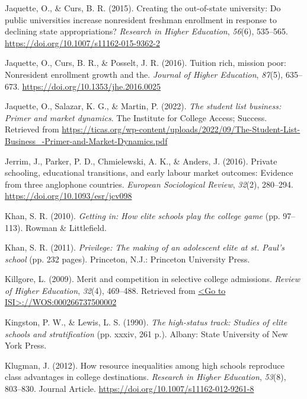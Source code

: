 \documentclass[
  12pt,
]{article}
\newlength{\cslhangindent}
\newlength{\cslentryspacingunit} %
\newenvironment{CSLReferences}[2] %
 {%
  \setlength{\parindent}{0pt}
  \ifodd #1
  \let\oldpar\par
  \def\par{\hangindent=\cslhangindent\oldpar}
  \fi
  \setlength{\parskip}{#2\cslentryspacingunit}
 }%
 {}
\begin{document}
\begin{CSLReferences}{1}{0}
\leavevmode{}%
Jaquette, O., \& Curs, B. R. (2015). Creating the out-of-state university: Do public universities increase nonresident freshman enrollment in response to declining state appropriations? \emph{Research in Higher Education}, \emph{56}(6), 535--565. \url{https://doi.org/10.1007/s11162-015-9362-2}

\leavevmode{}%
Jaquette, O., Curs, B. R., \& Posselt, J. R. (2016). Tuition rich, mission poor: Nonresident enrollment growth and the. \emph{Journal of Higher Education}, \emph{87}(5), 635--673. \url{https://doi.org/10.1353/jhe.2016.0025}

\leavevmode{}%
Jaquette, O., Salazar, K. G., \& Martin, P. (2022). \emph{The student list business: Primer and market dynamics}. The Institute for College Access; Success. Retrieved from \url{https://ticas.org/wp-content/uploads/2022/09/The-Student-List-Business_-Primer-and-Market-Dynamics.pdf}

\leavevmode{}%
Jerrim, J., Parker, P. D., Chmielewski, A. K., \& Anders, J. (2016). Private schooling, educational transitions, and early labour market outcomes: Evidence from three anglophone countries. \emph{European Sociological Review}, \emph{32}(2), 280--294. \url{https://doi.org/10.1093/esr/jcv098}

\leavevmode{}%
Khan, S. R. (2010). \emph{Getting in: How elite schools play the college game} (pp. 97--113). Rowman \& Littlefield.

\leavevmode{}%
Khan, S. R. (2011). \emph{Privilege: The making of an adolescent elite at st. Paul's school} (pp. 232 pages). Princeton, N.J.: Princeton University Press.

\leavevmode{}%
Killgore, L. (2009). Merit and competition in selective college admissions. \emph{Review of Higher Education}, \emph{32}(4), 469--488. Retrieved from \href{\%3CGo\%20to\%20ISI\%3E://WOS:000266737500002}{\textless Go to ISI\textgreater://WOS:000266737500002}

\leavevmode{}%
Kingston, P. W., \& Lewis, L. S. (1990). \emph{The high-status track: Studies of elite schools and stratification} (pp. xxxiv, 261 p.). Albany: State University of New York Press.

\leavevmode{}%
Klugman, J. (2012). How resource inequalities among high schools reproduce class advantages in college destinations. \emph{Research in Higher Education}, \emph{53}(8), 803--830. Journal Article. \url{https://doi.org/10.1007/s11162-012-9261-8}


\end{CSLReferences}
\end{document}
